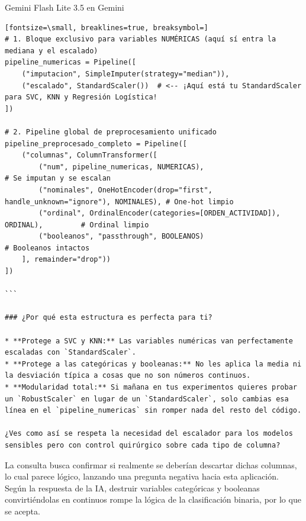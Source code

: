 \documentclass[12pt,a4paper,oneside]{book}
\begin{document}
\begin{iaresp}{Gemini Flash Lite 3.5 en Gemini}
\begin{Verbatim}[fontsize=\small, breaklines=true, breaksymbol=]
# 1. Bloque exclusivo para variables NUMÉRICAS (aquí sí entra la mediana y el escalado)
pipeline_numericas = Pipeline([
    ("imputacion", SimpleImputer(strategy="median")),
    ("escalado", StandardScaler())  # <-- ¡Aquí está tu StandardScaler para SVC, KNN y Regresión Logística!
])

# 2. Pipeline global de preprocesamiento unificado
pipeline_preprocesado_completo = Pipeline([
    ("columnas", ColumnTransformer([
        ("num", pipeline_numericas, NUMERICAS),                                   # Se imputan y se escalan
        ("nominales", OneHotEncoder(drop="first", handle_unknown="ignore"), NOMINALES), # One-hot limpio
        ("ordinal", OrdinalEncoder(categories=[ORDEN_ACTIVIDAD]), ORDINAL),         # Ordinal limpio
        ("booleanos", "passthrough", BOOLEANOS)                                   # Booleanos intactos
    ], remainder="drop"))
])

```

### ¿Por qué esta estructura es perfecta para ti?

* **Protege a SVC y KNN:** Las variables numéricas van perfectamente escaladas con `StandardScaler`.
* **Protege a las categóricas y booleanas:** No les aplica la media ni la desviación típica a cosas que no son números continuos.
* **Modularidad total:** Si mañana en tus experimentos quieres probar un `RobustScaler` en lugar de un `StandardScaler`, solo cambias esa línea en el `pipeline_numericas` sin romper nada del resto del código.

¿Ves como así se respeta la necesidad del escalador para los modelos sensibles pero con control quirúrgico sobre cada tipo de columna?
\end{Verbatim}
\end{iaresp}
\begin{iaanalisis}
La consulta busca confirmar si realmente se deberían descartar dichas columnas, lo cual parece lógico, lanzando una pregunta negativa hacia esta aplicación. Según la respuesta de la IA, destruir variables categóricas y booleanas convirtiéndolas en continuos rompe la lógica de la clasificación binaria, por lo que se acepta.
\end{iaanalisis}
\end{document}

